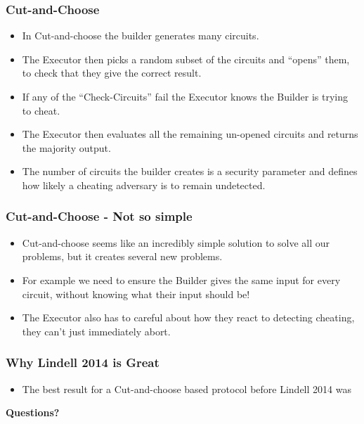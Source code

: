 \documentclass{beamer}
\begin{document}
	
	\begin{frame}
		\frametitle{Cut-and-Choose}
		\begin{itemize}
			\item In Cut-and-choose the builder generates many circuits.
			\item The Executor then picks a random subset of the circuits and ``opens'' them, to check that they give the correct result.
			\item If any of the ``Check-Circuits'' fail the Executor knows the Builder is trying to cheat.
			\item The Executor then evaluates all the remaining un-opened circuits and returns the majority output.
			\item The number of circuits the builder creates is a security parameter and defines how likely a cheating adversary is to remain undetected.
		\end{itemize}
	\end{frame}

	
	\begin{frame}
		\frametitle{Cut-and-Choose - Not so simple}
		\begin{itemize}
			\item Cut-and-choose seems like an incredibly simple solution to solve all our problems, but it creates several new problems.
			\item For example we need to ensure the Builder gives the same input for every circuit, without knowing what their input should be!
			\item The Executor also has to careful about how they react to detecting cheating, they can't just immediately abort.
		\end{itemize}
	\end{frame}
	

	\begin{frame}
		\frametitle{Why Lindell 2014 is Great}
		\begin{itemize}
			\item The best result for a Cut-and-choose based protocol before Lindell 2014 was 
		\end{itemize}
	\end{frame}
	
	
	\begin{frame}
		\begin{center}
			\textbf{ \LARGE Questions?}
		\end{center}

	\end{frame}
\end{document}
